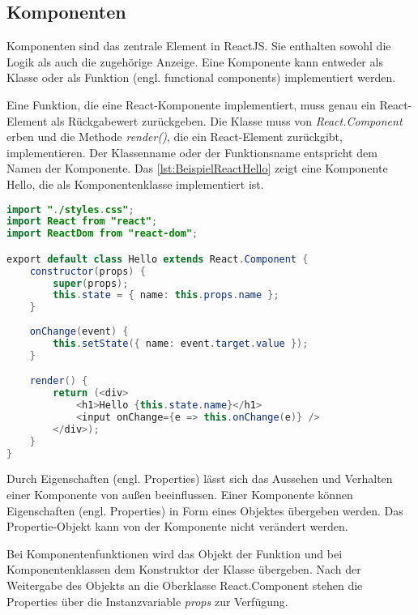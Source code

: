 \subsection{Komponenten}\label{sec:reactKomponenten}

Komponenten sind das zentrale Element in ReactJS. Sie enthalten sowohl die Logik als auch die zugehörige Anzeige. Eine Komponente kann entweder als Klasse oder als Funktion (engl. functional components) implementiert werden. 

Eine Funktion, die eine React-Komponente implementiert, muss genau ein React-Element als Rückgabewert zurückgeben. Die Klasse muss von \textit{React.Component} erben und die Methode \textit{render()}, die ein React-Element zurückgibt, implementieren. Der Klassenname oder der Funktionsname entspricht dem Namen der Komponente.\autocite[vgl.][80\psqq]{Zeigermann.2016} Das \autoref{lst:BeispielReactHello} zeigt eine Komponente Hello, die als Komponentenklasse implementiert ist. 


\begin{lstlisting}[caption=Beispiel React-Anwendung: Die Komponente Hello, label=lst:BeispielReactHello, language=Java]
import "./styles.css";
import React from "react";
import ReactDom from "react-dom";

export default class Hello extends React.Component {
	constructor(props) {
		super(props);
		this.state = { name: this.props.name };
	}
	
	onChange(event) {
		this.setState({ name: event.target.value });
	}

	render() {
		return (<div>
			<h1>Hello {this.state.name}</h1>
			<input onChange={e => this.onChange(e)} />
		</div>);
	}
}
\end{lstlisting}

Durch Eigenschaften (engl. Properties) lässt sich das Aussehen und Verhalten einer Komponente von außen beeinflussen. Einer Komponente können Eigenschaften (engl. Properties) in Form eines Objektes übergeben werden. Das Propertie-Objekt kann von der Komponente nicht verändert werden. 

Bei Komponentenfunktionen wird das Objekt der Funktion und bei Komponentenklassen dem Konstruktor der Klasse übergeben. Nach der Weitergabe des Objekts an die Oberklasse React.Component stehen die Properties über die Instanzvariable \textit{props} zur Verfügung. \autocites[vgl.][24\psq,83-88]{Zeigermann.2016}[vgl.][12-17]{Stefanov.2017}


